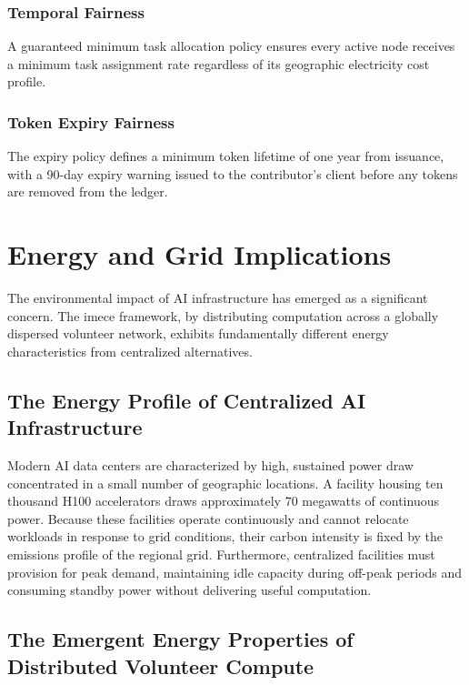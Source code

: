\documentclass[12pt]{article}
\begin{document}
\subsubsection{Temporal Fairness}

A guaranteed minimum task allocation policy ensures every active node receives a minimum task assignment rate regardless of its geographic electricity cost profile.

\subsubsection{Token Expiry Fairness}

The expiry policy defines a minimum token lifetime of one year from issuance, with a 90-day expiry warning issued to the contributor's client before any tokens are removed from the ledger.

\section{Energy and Grid Implications}
\label{sec:energy}

The environmental impact of AI infrastructure has emerged as a significant concern. The imece framework, by distributing computation across a globally dispersed volunteer network, exhibits fundamentally different energy characteristics from centralized alternatives.

\subsection{The Energy Profile of Centralized AI Infrastructure}

Modern AI data centers are characterized by high, sustained power draw concentrated in a small number of geographic locations. A facility housing ten thousand H100 accelerators draws approximately 70 megawatts of continuous power. Because these facilities operate continuously and cannot relocate workloads in response to grid conditions, their carbon intensity is fixed by the emissions profile of the regional grid. Furthermore, centralized facilities must provision for peak demand, maintaining idle capacity during off-peak periods and consuming standby power without delivering useful computation.

\subsection{The Emergent Energy Properties of Distributed Volunteer Compute}
\end{document}
